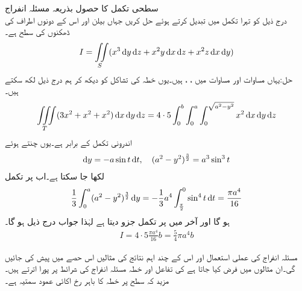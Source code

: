 \quad سطحی تکمل کا حصول بذریعہ مسئلہ انفراج\\
درج ذیل کو تہرا  تکمل میں تبدیل کرتے ہوئے حل کریں جہاں  بیلن  اور اس کے دونوں اطراف کی ڈھکنوں کی سطح ہے۔
\begin{align*}
I=\iint\limits_S (x^3\dif y\dif z+x^2y\dif x\dif z+x^2z\dif x\dif y)
\end{align*}
حل:یہاں مساوات  اور مساوات  میں ، ،  ہیں۔یوں خطہ  کی تشاکل کو دیکھ کر ہم درج ذیل لکھ سکتے ہیں۔
\begin{align*}
\iiint\limits_T (3x^2+x^2+x^2)\dif x\dif y\dif z=4\cdot 5\int_0^b \int_0^a\int_0^{\sqrt{a^2-y^2}}x^2\dif x\dif y\dif z
\end{align*}
اندرونی تکمل  کے برابر ہے۔یوں  چنتے ہوئے
\begin{align*}
\dif y=-a\sin t\dif t,\quad (a^2-y^2)^{\frac{3}{2}}=a^3\sin^3 t
\end{align*}
لکھا جا سکتا ہے۔اب  پر تکمل
\begin{align*}
\frac{1}{3}\int_0^a (a^2-y^2)^{\frac{3}{2}}\dif y=-\frac{1}{3} a^4\int_{\frac{\pi}{2}}^{0}\sin^4 t \dif t=\frac{\pi a^4}{16}
\end{align*}
ہو گا اور آخر میں  پر تکمل جزو  دیتا  ہے لہٰذا جواب درج ذیل ہو گا۔
\begin{align*}
I=4\cdot 5\frac{\pi a^4}{16}b=\frac{5}{4}\pi a^4b
\end{align*}

مسئلہ انفراج کی عملی استعمال اور اس کے چند اہم نتائج کی مثالیں اس حصے میں پیش کی جائیں گی۔ان مثالوں میں فرض کیا جاتا ہے کی تفاعل اور خطہ  مسئلہ انفراج کی شرائط  پر پورا اترتے ہیں۔ مزید کہ سطح  پر خطہ  کا باہر رخ اکائی عمود سمتیہ   ہے۔

